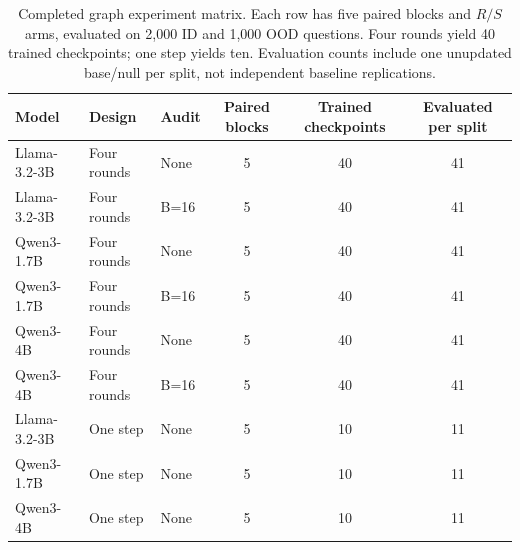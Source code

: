 \begin{table}[H]
\caption{Completed graph experiment matrix. Each row has five paired blocks and $R/S$ arms, evaluated on 2,000 ID and 1,000 OOD questions. Four rounds yield 40 trained checkpoints; one step yields ten. Evaluation counts include one unupdated base/null per split, not independent baseline replications.}
\label{tab:h100-progress}
\centering\small\setlength{\tabcolsep}{4pt}
\begin{tabular}{@{}lllccc@{}}
\toprule
Model & Design & Audit & Paired blocks & Trained checkpoints & Evaluated per split\\
\midrule
Llama-3.2-3B & Four rounds & None & 5 & 40 & 41\\
Llama-3.2-3B & Four rounds & B=16 & 5 & 40 & 41\\
Qwen3-1.7B & Four rounds & None & 5 & 40 & 41\\
Qwen3-1.7B & Four rounds & B=16 & 5 & 40 & 41\\
Qwen3-4B & Four rounds & None & 5 & 40 & 41\\
Qwen3-4B & Four rounds & B=16 & 5 & 40 & 41\\
\addlinespace
Llama-3.2-3B & One step & None & 5 & 10 & 11\\
Qwen3-1.7B & One step & None & 5 & 10 & 11\\
Qwen3-4B & One step & None & 5 & 10 & 11\\
\bottomrule
\end{tabular}
\end{table}

